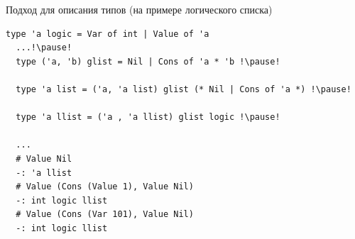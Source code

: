 \documentclass[10pt, mathserif]{beamer}
\theoremstyle{definition}
\begin{document}
\begin{frame}[fragile]{Подход для описания типов (на примере логического списка)}
  \begin{lstlisting}[mathescape=true]
  type 'a logic = Var of int | Value of 'a
  ...!\pause!
  type ('a, 'b) glist = Nil | Cons of 'a * 'b !\pause!

  type 'a list = ('a, 'a list) glist (* Nil | Cons of 'a *) !\pause!

  type 'a llist = ('a , 'a llist) glist logic !\pause!

  ...
  # Value Nil
  -: 'a llist
  # Value (Cons (Value 1), Value Nil)
  -: int logic llist
  # Value (Cons (Var 101), Value Nil)
  -: int logic llist
  \end{lstlisting}
\end{frame}
%
%
%
%
\end{document}

